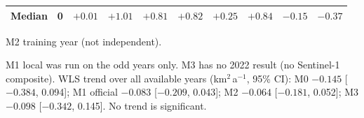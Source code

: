 \documentclass[10pt]{article}
\newcommand{\kmsq}{km$^2$}
\newcommand{\tr}{$^\dagger$}   %
\begin{document}
\begin{table}
\begin{threeparttable}
\begin{tabular}{l ccccccccc}
Median                             & 0 & $+0.01$ & $+1.01$ & $+0.81$ & $+0.82$ & $+0.25$ & $+0.84$ & $-0.15$ & $-0.37$ \\
\bottomrule
\end{tabular}
\begin{tablenotes}\footnotesize
\item[\tr] M2 training year (not independent).
\item M1 local was run on the odd years only. M3 has no 2022 result (no Sentinel-1 composite).
WLS trend over all available years (\kmsq\,a$^{-1}$, 95\% CI): M0 $-0.145$ [$-0.384$, 0.094];
M1 official $-0.083$ [$-0.209$, 0.043]; M2 $-0.064$ [$-0.181$, 0.052]; M3 $-0.098$ [$-0.342$, 0.145].
No trend is significant.
\end{tablenotes}
\end{threeparttable}
\end{table}
\end{document}
